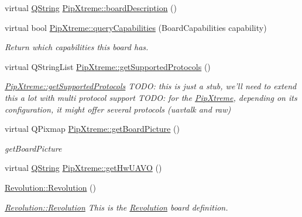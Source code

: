 \begin{DoxyCompactItemize}
\item 
virtual \hyperlink{group___u_a_v_objects_plugin_gab9d252f49c333c94a72f97ce3105a32d}{\-Q\-String} \hyperlink{group___boards___open_pilot_plugin_ga31e2251cfd285fe24c515d5ee2e53062}{\-Pip\-Xtreme\-::board\-Description} ()
\item 
virtual bool \hyperlink{group___boards___open_pilot_plugin_ga4cb0d73f85ef11bb262d9d0a94c7b033}{\-Pip\-Xtreme\-::query\-Capabilities} (\-Board\-Capabilities capability)
\begin{DoxyCompactList}\small\item\em \-Return which capabilities this board has. \end{DoxyCompactList}\item 
virtual \-Q\-String\-List \hyperlink{group___boards___open_pilot_plugin_gac32d0b331396845ce602cc74ff751d83}{\-Pip\-Xtreme\-::get\-Supported\-Protocols} ()
\begin{DoxyCompactList}\small\item\em \hyperlink{group___boards___open_pilot_plugin_gac32d0b331396845ce602cc74ff751d83}{\-Pip\-Xtreme\-::get\-Supported\-Protocols} \-T\-O\-D\-O\-: this is just a stub, we'll need to extend this a lot with multi protocol support \-T\-O\-D\-O\-: for the \hyperlink{class_pip_xtreme}{\-Pip\-Xtreme}, depending on its configuration, it might offer several protocols (uavtalk and raw) \end{DoxyCompactList}\item 
virtual \-Q\-Pixmap \hyperlink{group___boards___open_pilot_plugin_gabfd6ccc67c330f1ffdcfdac97cc864f9}{\-Pip\-Xtreme\-::get\-Board\-Picture} ()
\begin{DoxyCompactList}\small\item\em get\-Board\-Picture \end{DoxyCompactList}\item 
virtual \hyperlink{group___u_a_v_objects_plugin_gab9d252f49c333c94a72f97ce3105a32d}{\-Q\-String} \hyperlink{group___boards___open_pilot_plugin_gad8bc1cdc90506b5549224c5c40b835ce}{\-Pip\-Xtreme\-::get\-Hw\-U\-A\-V\-O} ()
\item 
\hyperlink{group___boards___open_pilot_plugin_gad4ecc2008e08f7c54b4fe92215c77bbb}{\-Revolution\-::\-Revolution} ()
\begin{DoxyCompactList}\small\item\em \hyperlink{group___boards___open_pilot_plugin_gad4ecc2008e08f7c54b4fe92215c77bbb}{\-Revolution\-::\-Revolution} \-This is the \hyperlink{class_revolution}{\-Revolution} board definition. \end{DoxyCompactList}\item 

\end{DoxyCompactItemize}
